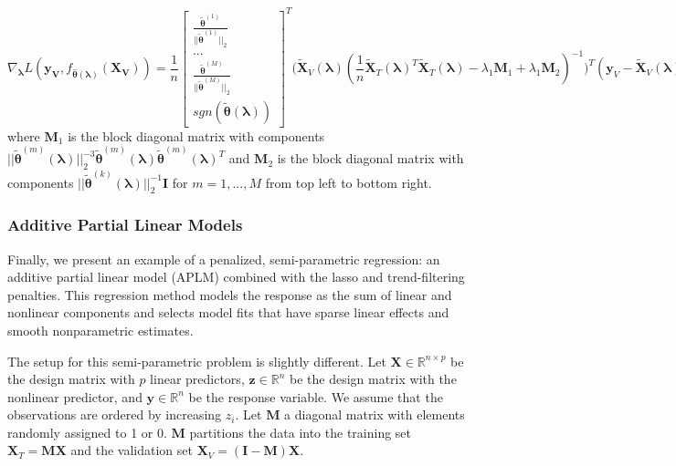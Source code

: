 \documentclass[10pt,letterpaper]{article}
\begin{document}
\begin{equation}
\nabla_{\boldsymbol \lambda} L(\boldsymbol{y_V}, f_{\hat{\boldsymbol{\theta}}(\boldsymbol{\lambda})}(\boldsymbol{X_V})) =
\frac{1}{n}
\begin{bmatrix}
\frac{\tilde{\boldsymbol{\theta}}^{(1)}}{||\tilde{\boldsymbol{\theta}}^{(1)}||_2}\\
...\\
\frac{\tilde{\boldsymbol\theta}^{(M)}}{||\tilde{\boldsymbol{\theta}}^{(M)}||_2}\\
sgn(\tilde{\boldsymbol{\theta}}(\boldsymbol{\lambda}))
\end{bmatrix}^T
\Bigg (
\tilde{\boldsymbol{X}}_V(\boldsymbol{\lambda})
(\frac{1}{n} \tilde{\boldsymbol{X}}_T(\boldsymbol{\lambda})^T \tilde{\boldsymbol{X}}_T(\boldsymbol{\lambda}) - \lambda_1 \boldsymbol{M}_1 + \lambda_1 \boldsymbol{M}_2)^{-1}
\Bigg )^T
(\boldsymbol{y}_V - \tilde{\boldsymbol{X}}_V(\boldsymbol{\lambda}) \tilde{\boldsymbol{\theta}}(\boldsymbol{\lambda}))
\end{equation}
where $\boldsymbol{M}_1$ is the block diagonal matrix with  components 
$
|| \tilde{\boldsymbol{\theta}}^{(m)}(\boldsymbol{\lambda})||_2^{-3} \tilde{\boldsymbol{\theta}}^{(m)}(\boldsymbol{\lambda}) \tilde{\boldsymbol{\theta}}^{(m)}(\boldsymbol{\lambda})^T
$ and $\boldsymbol{M}_2$ is the block diagonal matrix with components
$||\tilde{\boldsymbol{\theta}}^{(k)}(\boldsymbol{\lambda})||_2^{-1} \boldsymbol{I}$
for $m = 1, ..., M$ 
from top left to bottom right.

\subsubsection{Additive Partial Linear Models}

Finally, we present an example of a penalized, semi-parametric regression: an additive partial linear model (APLM) combined with the lasso and trend-filtering penalties. This regression method models the response as the sum of linear and nonlinear components and selects model fits that have sparse linear effects and smooth nonparametric estimates.

The setup for this semi-parametric problem is slightly different. Let $\boldsymbol{X} \in \mathbb{R}^{n \times p}$ be the design matrix with $p$ linear predictors, $\boldsymbol{z} \in \mathbb{R}^n$ be the design matrix with the nonlinear predictor, and $\boldsymbol{y} \in \mathbb{R}^n$ be the response variable. We assume that the observations are ordered by increasing $z_i$. Let $\boldsymbol{M}$ a diagonal matrix with elements randomly assigned to 1 or 0. $\boldsymbol{M}$ partitions the data into the training set $\boldsymbol{X}_T= \boldsymbol{M} \boldsymbol{X}$ and the validation set $\boldsymbol{X}_V= (\boldsymbol{I} - \boldsymbol{M}) \boldsymbol{X}$.
\end{document}
